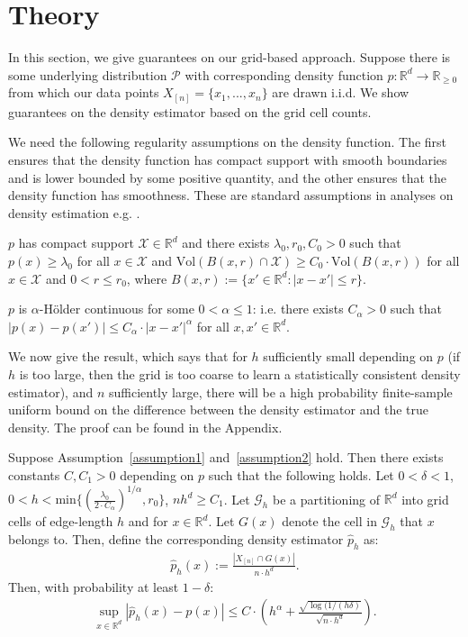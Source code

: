 \section{Theory}
In this section, we give guarantees on our grid-based approach. Suppose there is some underlying distribution $\mathcal{P}$ with corresponding density function $p : \mathbb{R}^d \rightarrow \mathbb{R}_{\ge 0}$ from which our data points $X_{[n]} = \{x_1,...,x_n\}$ are drawn i.i.d. We show guarantees on the density estimator based on the grid cell counts.

We need the following regularity assumptions on the density function. The first ensures that the density function has compact support with smooth boundaries and is lower bounded by some positive quantity, and the other ensures that the density function has smoothness. These are standard assumptions in analyses on density estimation e.g. \cite{gine2002rates,jiang2017uniform,chen2017tutorial,singh2009adaptive}.
\begin{assumption}\label{assumption1}
$p$ has compact support $\mathcal{X} \in \mathbb{R}^d$ and there exists $\lambda_0, r_0, C_0 > 0$ such that $p(x) \ge \lambda_0$ for all $x \in \mathcal{X}$ and $\text{Vol}(B(x, r) \cap \mathcal{X}) \ge C_0 \cdot \text{Vol}(B(x, r))$ for all $x \in \mathcal{X}$ and $0 < r \le r_0$, where $B(x, r) := \{x' \in \mathbb{R}^d: |x-x'| \le r\}$.
\end{assumption}
\begin{assumption}\label{assumption2}
$p$ is $\alpha$-Hölder continuous for some $0 < \alpha \le 1$: i.e. there exists $C_\alpha > 0$ such that $|p(x) - p(x')| \le C_\alpha \cdot |x - x'|^\alpha$ for all $x, x' \in \mathbb{R}^d$.
\end{assumption}

We now give the result, which says that for $h$ sufficiently small depending on $p$ (if $h$ is too large, then the grid is too coarse to learn a statistically consistent density estimator), and $n$ sufficiently large, there will be a high probability finite-sample uniform bound on the difference between the density estimator and the true density. The proof can be found in the Appendix.
\begin{theorem}\label{theorem}
Suppose Assumption~\ref{assumption1} and~\ref{assumption2} hold. Then there exists constants $C, C_{1} > 0$ depending on $p$ such that the following holds.
Let $0 < \delta < 1$, $0 < h < \text{min}\{\left(\frac{\lambda_0}{2\cdot C_\alpha}\right)^{1/\alpha}, r_0\}$, $nh^d \ge C_1$. Let $\mathcal{G}_h$ be a partitioning of $\mathbb{R}^d$ into grid cells of edge-length $h$ and for $x \in \mathbb{R}^d$. Let $G(x)$ denote the cell in $\mathcal{G}_h$ that $x$ belongs to.  Then, define the corresponding density estimator $\widehat{p}_h$ as:
\begin{align*}
    \widehat{p}_h(x) := \frac{|X_{[n]} \cap G(x)|}{n\cdot h^d}.
\end{align*}
Then, with probability at least $1 - \delta$:
\begin{align*}
    \sup_{x \in \mathbb{R}^d} |\widehat{p}_h(x)  - p(x)| \le C\cdot \left( h^\alpha + \frac{\sqrt{\log(1/(h\delta)}}{\sqrt{n\cdot h^d}} \right).
\end{align*}
\end{theorem}


